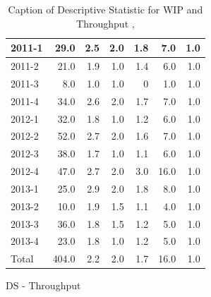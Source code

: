 \documentclass[UKenglish]{ifimaster}  %
\begin{document}
\begin{appendices}
\begin{table}[!htbp]
\begin{adjustwidth}{-2.5cm}{}
\begin{subfigure}[b]{0.3\textwidth}
{\begin{tabular}{ | l | r | r | r | r | r | r | }
2011-1 & 29.0 & 2.5 & 2.0 & 1.8 & 7.0 & 1.0\\ \hline
2011-2 & 21.0 & 1.9 & 1.0 & 1.4 & 6.0 & 1.0\\ \hline
2011-3 & 8.0 & 1.0 & 1.0 & 0 & 1.0 & 1.0\\ \hline
2011-4 & 34.0 & 2.6 & 2.0 & 1.7 & 7.0 & 1.0\\ \hline
2012-1 & 32.0 & 1.8 & 1.0 & 1.2 & 6.0 & 1.0\\ \hline
2012-2 & 52.0 & 2.7 & 2.0 & 1.6 & 7.0 & 1.0\\ \hline
2012-3 & 38.0 & 1.7 & 1.0 & 1.1 & 6.0 & 1.0\\ \hline
2012-4 & 47.0 & 2.7 & 2.0 & 3.0 & 16.0 & 1.0\\ \hline
2013-1 & 25.0 & 2.9 & 2.0 & 1.8 & 8.0 & 1.0\\ \hline
2013-2 & 10.0 & 1.9 & 1.5 & 1.1 & 4.0 & 1.0\\ \hline
2013-3 & 36.0 & 1.8 & 1.5 & 1.2 & 5.0 & 1.0\\ \hline
2013-4 & 23.0 & 1.8 & 1.0 & 1.2 & 5.0 & 1.0\\ \hline
Total & 404.0 & 2.2 & 2.0 & 1.7 & 16.0 & 1.0\\ \hline
\end{tabular}
}
\caption{DS - Throughput}
 \label{DS:Throughput:10}
\end{subfigure}
\end{adjustwidth}
\caption[Optional caption for list of figures]{Caption of Descriptive Statistic for WIP and Throughput  , }
\label{DS:10:1}
\end{table}


\end{appendices}
\end{document}
